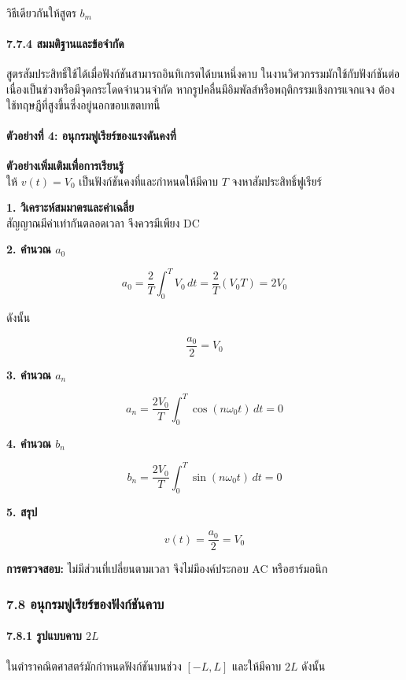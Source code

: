 วิธีเดียวกันให้สูตร \(b_m\)

\paragraph{7.7.4 สมมติฐานและข้อจำกัด}

สูตรสัมประสิทธิ์ใช้ได้เมื่อฟังก์ชันสามารถอินทิเกรตได้บนหนึ่งคาบ ในงานวิศวกรรมมักใช้กับฟังก์ชันต่อเนื่องเป็นช่วงหรือมีจุดกระโดดจำนวนจำกัด หากรูปคลื่นมีอิมพัลส์หรือพฤติกรรมเชิงการแจกแจง ต้องใช้ทฤษฎีที่สูงขึ้นซึ่งอยู่นอกขอบเขตบทนี้

\paragraph{ตัวอย่างที่ 4: อนุกรมฟูเรียร์ของแรงดันคงที่}

\textbf{ตัวอย่างเพิ่มเติมเพื่อการเรียนรู้}\\
ให้ \(v(t)=V_0\) เป็นฟังก์ชันคงที่และกำหนดให้มีคาบ \(T\) จงหาสัมประสิทธิ์ฟูเรียร์

\textbf{1. วิเคราะห์สมมาตรและค่าเฉลี่ย}\\
สัญญาณมีค่าเท่ากันตลอดเวลา จึงควรมีเพียง DC

\textbf{2. คำนวณ \(a_0\)}

\[
a_0=\frac{2}{T}\int_{0}^{T}V_0\,dt
=\frac{2}{T}(V_0T)=2V_0
\]

ดังนั้น

\[
\frac{a_0}{2}=V_0
\]

\textbf{3. คำนวณ \(a_n\)}

\[
a_n=\frac{2V_0}{T}\int_0^T\cos(n\omega_0t)\,dt=0
\]

\textbf{4. คำนวณ \(b_n\)}

\[
b_n=\frac{2V_0}{T}\int_0^T\sin(n\omega_0t)\,dt=0
\]

\textbf{5. สรุป}

\[
v(t)=\frac{a_0}{2}=V_0
\]

\textbf{การตรวจสอบ:} ไม่มีส่วนที่เปลี่ยนตามเวลา จึงไม่มีองค์ประกอบ AC หรือฮาร์มอนิก

\subsubsection{7.8 อนุกรมฟูเรียร์ของฟังก์ชันคาบ}

\paragraph{7.8.1 รูปแบบคาบ \(2L\)}

ในตำราคณิตศาสตร์มักกำหนดฟังก์ชันบนช่วง \([-L,L]\) และให้มีคาบ \(2L\) ดังนั้น

